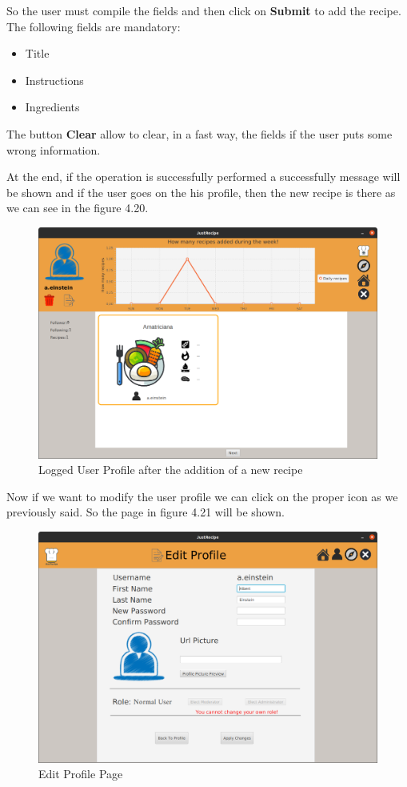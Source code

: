 \documentclass[a4paper]{report}
\begin{document}
\noindent So the user must compile the fields and then click on \textbf{Submit} to add the recipe. The following fields are mandatory:
\begin{itemize}
	\item Title
	\item Instructions
	\item Ingredients
\end{itemize}

\noindent The button \textbf{Clear} allow to clear, in a fast way, the fields if the user puts some wrong information.

\noindent At the end, if the operation is successfully performed a successfully message will be shown and if the user goes on the his profile, then the new recipe is there as we can see in the figure 4.20.

\begin{figure}[htpb]
	\centering
	\includegraphics[scale=0.25]{img/user_manual/afteraddrecipe.png}
	\caption{Logged User Profile after the addition of a new recipe}
\end{figure}

\noindent Now if we want to modify the user profile we can click on the proper icon as we previously said. So the page in figure 4.21 will be shown.

\begin{figure}[htpb]
	\centering
	\includegraphics[scale=0.25]{img/user_manual/editprofile.png}
	\caption{Edit Profile Page}
\end{figure}
\end{document}
